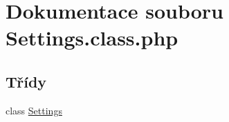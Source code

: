 \hypertarget{_settings_8class_8php}{\section{Dokumentace souboru Settings.\-class.\-php}
\label{_settings_8class_8php}
}
\subsection*{Třídy}
\begin{DoxyCompactItemize}
\item 
class \hyperlink{class_settings}{Settings}
\end{DoxyCompactItemize}
